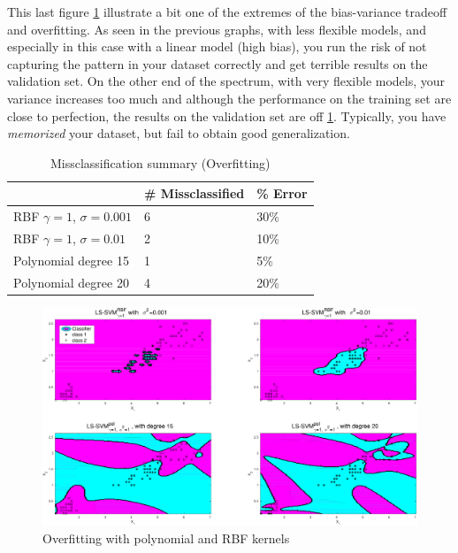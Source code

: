 \documentclass[11pt, a4paper]{article}
\begin{document}
This last figure \ref{fig:iris_overfitting} illustrate a bit one of
the extremes of the bias-variance tradeoff and overfitting. As seen in
the previous graphs, with less flexible models, and especially in this
case with a linear model (high bias), you run the risk of not
capturing the pattern in your dataset correctly and get terrible
results on the validation set. On the other end of the spectrum, with
very flexible models, your variance increases too much and although
the performance on the training set are close to perfection, the
results on the validation set are off
\ref{table:iris_overfitting}. Typically, you have \emph{memorized}
your dataset, but fail to obtain good generalization.

\begin{table}[H]
  \centering
  \begin{tabular}{l|l|l|}
    \cline{2-3}
    & \# Missclassified & \% Error \\ \hline
    \multicolumn{1}{|l|}{RBF $\gamma=1$, $\sigma=0.001$} & 6                 & 30\%     \\ \hline
    \multicolumn{1}{|l|}{RBF $\gamma=1$, $\sigma=0.01$}  & 2                 & 10\%      \\ \hline
    \multicolumn{1}{|l|}{Polynomial degree 15}    & 1                 & 5\%      \\ \hline
    \multicolumn{1}{|l|}{Polynomial degree 20}   & 4                 & 20\%      \\ \hline
  \end{tabular}
  \label{table:iris_overfitting}
  \caption{Missclassification summary (Overfitting)}
\end{table}

\begin{figure}[H]
    \centering
    \includegraphics[scale=.40]{iris_overfitting.pdf}
    \caption{Overfitting with polynomial and RBF kernels}
    \label{fig:iris_overfitting}
\end{figure}
\end{document}
